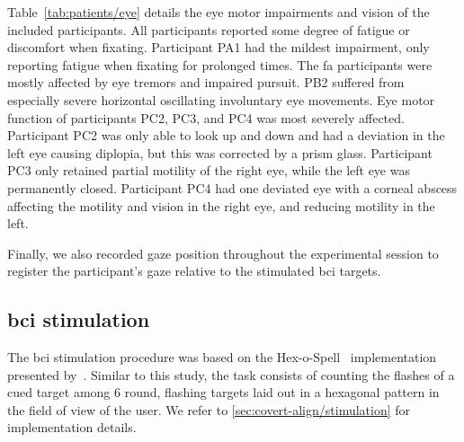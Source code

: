 Table~\ref{tab:patients/eye} details the eye motor impairments and vision of
the included participants.
All participants reported some degree of fatigue or discomfort when fixating.
Participant PA1 had the mildest impairment, only reporting fatigue when fixating
for prolonged times.
The \ac{fa} participants were mostly affected by eye tremors and impaired pursuit.
PB2 suffered from especially severe horizontal oscillating involuntary eye
movements.
Eye motor function of participants PC2, PC3, and PC4 was most severely affected.
Participant PC2 was only able to look up and down and had a deviation in the
left eye causing diplopia, but this was corrected by a prism glass.
Participant PC3 only retained partial motility of the right eye, while the left eye was permanently closed.
Participant PC4 had one deviated eye with a corneal abscess affecting the motility
and vision in the right eye, and reducing motility in the left.

\begin{table}[t]
  \centering
  \footnotesize
  
  \caption[Visual skills of the included participants.]{%
  Visual skills of the included participants.
  Visual~\ac{bci} skills~\cite{FriedOken2020}
  were assessed with a combination of self-reported issues
  by the subject and the NeuroEye~\cite{Hassan2022} test. \BigCross\
  impaired, \BigDiamondshape\ severely impaired.
  logMAR: lower is better.}
  \label{tab:patients/eye}
\end{table}


Finally, we also recorded gaze position throughout the experimental session to
register the participant's gaze relative to the stimulated \ac{bci} targets.

\subsection{\Acs{bci} stimulation}

The \ac{bci} stimulation procedure was based on the
Hex-o-Spell~\cite{Treder2010} implementation presented
by~\textcite{VanDenKerchove2024}.
Similar to this study, the task consists of counting the flashes of a cued
target among 6 round, flashing targets laid out in a hexagonal pattern in the
field of view of the user.
We refer to \cref{sec:covert-align/stimulation} for implementation details.

